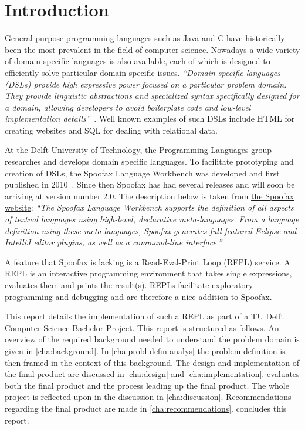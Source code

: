 \chapter{Introduction}
\label{cha:introduction}

General purpose programming languages such as Java and C have historically been
the most prevalent in the field of computer science. Nowadays a wide variety of
domain specific languages is also available, each of which is designed to
efficiently solve particular domain specific issues. \textit{``Domain-specific
languages (DSLs) provide high expressive power focused on a particular problem
domain. They provide linguistic abstractions and specialized syntax
specifically designed for a domain, allowing developers to avoid boilerplate
code and low-level implementation details''}~\cite{Kats10a}. Well known
examples of such DSLs include HTML for creating websites and SQL for dealing
with relational data.

At the Delft University of Technology, the Programming Languages group researches and develops domain specific languages. To
facilitate prototyping and creation of DSLs, the Spoofax Language Workbench was
developed and first published in 2010~\cite{Kats10a}. Since then Spoofax has had
several releases and will soon be arriving at version number 2.0. The
description below is taken from \href{http://spoofax.org}{the Spoofax website}:
\textit{``The Spoofax Language Workbench supports the definition of all aspects
of textual languages using high-level, declarative meta-languages. From a
language definition using these meta-languages, Spoofax generates full-featured
Eclipse and IntelliJ editor plugins, as well as a command-line interface.''}

A feature that Spoofax is lacking is a Read-Eval-Print Loop (REPL) service. A
REPL is an interactive programming environment that takes single expressions,
evaluates them and prints the result(s). REPLs facilitate exploratory
programming and debugging and are therefore a nice addition to Spoofax.

This report details the implementation of such a REPL as part of a
TU Delft Computer Science Bachelor Project. This report is structured as
follows. An overview of the
required background needed to understand the problem domain is given in
\cref{cha:background}. In \cref{cha:probl-defin-analys} the problem definition
is then framed in the context of this background. The design and implementation
of the final product are discussed in \cref{cha:design} and
\cref{cha:implementation}.  evaluates both the
final product and the process leading up the final product. The whole
project is reflected upon in the discussion in \cref{cha:discussion}.
Recommendations regarding the final product are made in
\cref{cha:recommendations}.  concludes this report.

